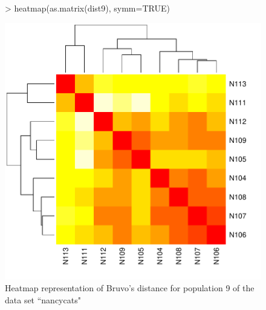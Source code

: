 \documentclass[letterpaper]{article}
\begin{document}
\begin{figure}[h!]
  \centering
  \caption{\footnotesize Heatmap representation of Bruvo's distance for population 9 of the data set ``nancycats"}
  \label{bruvo_heat_map}
\begin{Schunk}
\begin{Sinput}
> heatmap(as.matrix(dist9), symm=TRUE)
\end{Sinput}
\end{Schunk}
\includegraphics{poppr_manual-116}
\end{figure}
\end{document}
